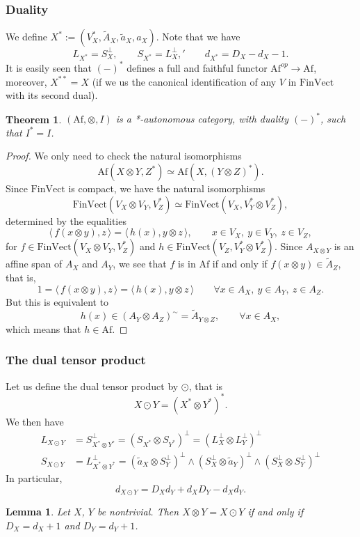 \documentclass[12pt]{article}
\newtheorem{lemma}{Lemma}
\newtheorem{theorem}{Theorem}
\theoremstyle{definition}
\theoremstyle{remark}
\def\<{\langle\,}
\def\>{\,\rangle}
\def \Af{\mathrm{Af}}
\def \FV{\mathrm{FinVect}}
\begin{document}
\subsubsection{Duality}

We define $X^*:=(V_X^*,\tilde A_X,\tilde a_X,a_X)$. Note that we have
\[
L_{X^*}=S_X^\perp,\qquad S_{X^*}=L_X^\perp,'\qquad d_{X^*}=D_X-d_X-1.
\]
It is easily seen  that $(-)^*$ defines a full and faithful functor $\Af^{op}\to \Af$,
moreover, $X^{**}=X$ (if we us the canonical identification of  any $V$ in $\FV$ with its second dual). 


\begin{theorem} $(\Af,\otimes,I)$ is a *-autonomous category, with duality $(-)^*$, such
that $I^*=I$.

\end{theorem}


\begin{proof} We only need to check the natural isomorphisms 
\[
\Af(X\otimes Y,Z^*)\simeq \Af(X,(Y\otimes Z)^*).
\]
Since $\FV$ is compact, we have the natural isomorphisms
\[
\FV(V_X\otimes V_Y,V^*_Z)\simeq \FV(V_X,V_Y^*\otimes V_Z^*),
\]
determined by the equalities
\[
\<f(x\otimes y),z\>=\<h(x),y\otimes z\>,\qquad x\in V_X,\ y\in V_Y,\ z\in V_Z,
\]
for $f\in \FV(V_X\otimes V_Y,V_Z^*)$ and $h\in \FV(V_Z,V_Y^*\otimes V_Z^*)$. Since
$A_{X\otimes Y}$ is an affine span of $A_X$ and $A_Y$, we see that
$f$ is in $\Af$ if and only if $f(x\otimes y)\in \tilde A_Z$, that is, 
\[
1=\<f(x\otimes y),z\>=\<h(x),y\otimes z\>\qquad \forall x\in A_X,\
y\in A_Y,\ z\in A_Z.
\]
But this is equivalent to
\[
h(x)\in (A_Y\otimes A_Z)^\sim=\tilde A_{Y\otimes Z},\qquad \forall x\in A_X,
\]
which means that $h\in \Af$.

\end{proof}

\subsubsection{The dual tensor product}

Let us define the dual tensor product by $\odot$, that is
\[
X\odot Y=(X^*\otimes Y^*)^*.
\]
We then have
\begin{align*}
L_{X\odot Y}&=S^\perp_{X^*\otimes Y^*}=(S_{X^*}\otimes S_{Y^*})^\perp=(L_X^\perp\otimes
L_Y^\perp)^\perp\\
S_{X\odot Y}&= L_{X^*\otimes Y^*}^\perp=(\tilde a_X\otimes
S_Y^\perp)^\perp\wedge(S_X^\perp\otimes \tilde a_Y)^\perp\wedge (S_X^\perp\otimes
S_Y^\perp)^\perp
\end{align*}
In particular,
\[
d_{X\odot Y}=D_Xd_Y+d_XD_Y-d_Xd_Y.
\]
\begin{lemma}\label{lemma:tensors} Let $X$, $Y$ be nontrivial. Then $X\otimes Y=X\odot Y$
if and only if $D_X=d_X+1$ and $D_Y=d_Y+1$.

\end{lemma}
\end{document}
